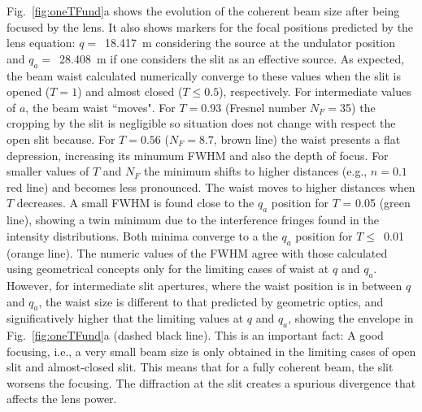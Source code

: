 \documentclass[9pt,twocolumn,twoside]{osajnl}
\begin{document}
Fig.~\ref{fig:oneTFund}a shows the evolution of the coherent beam size after being focused by the lens. It also shows markers for the focal positions predicted by the lens equation:  $q=$~\SI{18.417}{\meter} considering the source at the undulator position and $q_a=$~\SI{28.408}{\meter} if one considers the slit as an effective source. As expected, the beam waist calculated numerically converge to these values when the slit is opened ($T = 1$) and almost closed ($T \le 0.5$), respectively. For intermediate values of $a$, the beam waist ``moves". For $T=$0.93 (Fresnel number $N_F=$35) the cropping by the slit is negligible so situation does not change with respect the open slit because. For $T=0.56$ ($N_F=8.7$, brown line) the waist presents a flat depression, increasing its minumum FWHM and also the depth of focus. For smaller values of $T$ and $N_F$ the minimum shifts to higher distances (e.g., $n=0.1$ red line) and becomes less pronounced. The waist moves to higher distances when $T$ decreases. A small FWHM is found close to the $q_a$ position for $T$ = 0.05 (green line), showing a twin minimum due to the interference fringes found in the intensity distributions. Both minima converge to a the $q_a$ position for $T\le$~0.01 (orange line). 
The numeric values of the FWHM agree with those calculated using geometrical concepts only for the limiting cases of waist at $q$ and $q_a$. 
However, for intermediate slit apertures, where the waist position is in between $q$ and $q_a$, the waist size is different to that predicted by geometric optics, and significatively higher that the limiting values at $q$ and $q_a$, showing the envelope in Fig.~\ref{fig:oneTFund}a (dashed black line).
This is an important fact: A good focusing, i.e., a very small beam size is only obtained in the limiting cases of open slit and almost-closed slit. This means that for a fully coherent beam, the slit worsens the focusing. The diffraction at the slit creates a spurious divergence that affects the lens power. 
\end{document}
